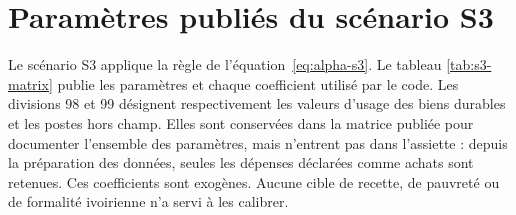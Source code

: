 \documentclass[11pt,a4paper]{article}
\begin{document}
\clearpage
\section{Paramètres publiés du scénario S3}
\label{annexe:s3-parameters}

Le scénario S3 applique la règle de l'équation~\eqref{eq:alpha-s3}. Le tableau
\ref{tab:s3-matrix} publie les paramètres et chaque coefficient utilisé par le
code. Les divisions 98 et 99 désignent respectivement les valeurs d'usage des
biens durables et les postes hors champ. Elles sont conservées dans la matrice
publiée pour documenter l'ensemble des paramètres, mais n'entrent pas dans
l'assiette : depuis la préparation des données, seules les dépenses déclarées
comme achats sont retenues. Ces coefficients sont exogènes. Aucune cible de
recette, de pauvreté ou de formalité ivoirienne n'a servi à les calibrer.
\end{document}
